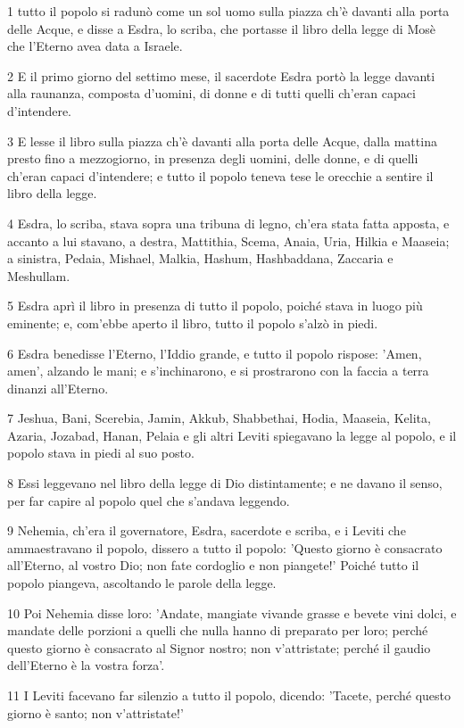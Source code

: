 \par 1 tutto il popolo si radunò come un sol uomo sulla piazza ch'è davanti alla porta delle Acque, e disse a Esdra, lo scriba, che portasse il libro della legge di Mosè che l'Eterno avea data a Israele.
\par 2 E il primo giorno del settimo mese, il sacerdote Esdra portò la legge davanti alla raunanza, composta d'uomini, di donne e di tutti quelli ch'eran capaci d'intendere.
\par 3 E lesse il libro sulla piazza ch'è davanti alla porta delle Acque, dalla mattina presto fino a mezzogiorno, in presenza degli uomini, delle donne, e di quelli ch'eran capaci d'intendere; e tutto il popolo teneva tese le orecchie a sentire il libro della legge.
\par 4 Esdra, lo scriba, stava sopra una tribuna di legno, ch'era stata fatta apposta, e accanto a lui stavano, a destra, Mattithia, Scema, Anaia, Uria, Hilkia e Maaseia; a sinistra, Pedaia, Mishael, Malkia, Hashum, Hashbaddana, Zaccaria e Meshullam.
\par 5 Esdra aprì il libro in presenza di tutto il popolo, poiché stava in luogo più eminente; e, com'ebbe aperto il libro, tutto il popolo s'alzò in piedi.
\par 6 Esdra benedisse l'Eterno, l'Iddio grande, e tutto il popolo rispose: 'Amen, amen', alzando le mani; e s'inchinarono, e si prostrarono con la faccia a terra dinanzi all'Eterno.
\par 7 Jeshua, Bani, Scerebia, Jamin, Akkub, Shabbethai, Hodia, Maaseia, Kelita, Azaria, Jozabad, Hanan, Pelaia e gli altri Leviti spiegavano la legge al popolo, e il popolo stava in piedi al suo posto.
\par 8 Essi leggevano nel libro della legge di Dio distintamente; e ne davano il senso, per far capire al popolo quel che s'andava leggendo.
\par 9 Nehemia, ch'era il governatore, Esdra, sacerdote e scriba, e i Leviti che ammaestravano il popolo, dissero a tutto il popolo: 'Questo giorno è consacrato all'Eterno, al vostro Dio; non fate cordoglio e non piangete!' Poiché tutto il popolo piangeva, ascoltando le parole della legge.
\par 10 Poi Nehemia disse loro: 'Andate, mangiate vivande grasse e bevete vini dolci, e mandate delle porzioni a quelli che nulla hanno di preparato per loro; perché questo giorno è consacrato al Signor nostro; non v'attristate; perché il gaudio dell'Eterno è la vostra forza'.
\par 11 I Leviti facevano far silenzio a tutto il popolo, dicendo: 'Tacete, perché questo giorno è santo; non v'attristate!'

